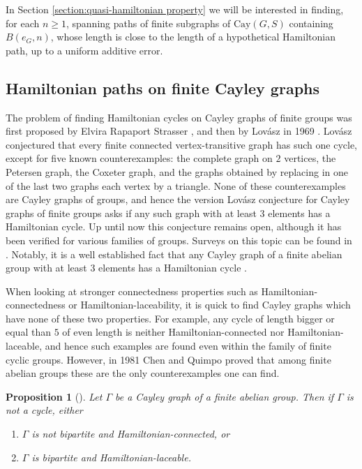 \documentclass[reqno,oneside]{amsart}
\newcommand{\cay}[2]{\mathrm{Cay}(#1,#2)}
\theoremstyle{plain}
\newtheorem{prop}[thm]{Proposition}
\theoremstyle{definition}
\begin{document}
In Section \ref{section:quasi-hamiltonian property} we will be interested in finding, for each $n\ge 1$, spanning paths of finite subgraphs of $\cay{G}{S}$ containing $B(e_G,n)$, whose length is close to the length of a hypothetical Hamiltonian path, up to a uniform additive error. 

\subsection{Hamiltonian paths on finite Cayley graphs}\label{subsection: Hamiltonian paths on finite Cayley graphs}
The problem of finding Hamiltonian cycles on Cayley graphs of finite groups was first proposed by Elvira Rapaport Strasser \cite{Rapaport1959}, and then by Lovász in 1969 \cite[Appendix IV. Problem 20]{BondyMurty1979}. Lovász conjectured that every finite connected vertex-transitive graph has such one cycle, except for five known counterexamples: the complete graph on $2$ vertices, the Petersen graph, the Coxeter graph, and the graphs obtained by replacing in one of the last two graphs each vertex by a triangle. None of these counterexamples are Cayley graphs of groups, and hence the version Lovász conjecture for Cayley graphs of finite groups asks if any such graph with at least $3$ elements has a Hamiltonian cycle. Up until now this conjecture remains open, although it has been verified for various families of groups. Surveys on this topic can be found in \cite{LanelPallageRatnayakeThevashaWelihinda2019,WitteGallian1984,CurranGallian1996}. Notably, it is a well established fact that any Cayley graph of a finite abelian group with at least $3$ elements has a Hamiltonian cycle \cite{Marusic1983}.




When looking at stronger connectedness properties such as Hamiltonian-connectedness or Hamiltonian-laceability, it is quick to find Cayley graphs which have none of these two properties. For example, any cycle of length bigger or equal than $5$ of even length is neither Hamiltonian-connected nor Hamiltonian-laceable, and hence such examples are found even within the family of finite cyclic groups. However, in 1981 Chen and Quimpo proved that among finite abelian groups these are the only counterexamples one can find.

\begin{prop}[\cite{ChenQuimpo1981}] \label{prop: cayley graphs of abelian finite group are either cycles, Hamiltonian connected or Hamiltonian laceable } Let $\Gamma$ be a Cayley graph of a finite abelian group. Then if $\Gamma$ is not a cycle, either
	\begin{enumerate}
		\item $\Gamma$ is not bipartite and Hamiltonian-connected, or
		\item $\Gamma$ is bipartite and Hamiltonian-laceable.
	\end{enumerate}
\end{prop}
\end{document}
